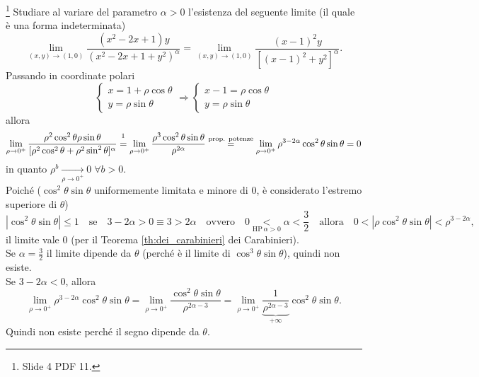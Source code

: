 \begin{example}\footnote{Slide 4 PDF 11.}
    Studiare al variare del parametro $\alpha>0$ l'esistenza del seguente limite (il quale è una forma indeterminata)
    \begin{equation*}
        \lim_{(x,y)\rightarrow(1,0)}\frac{(x^2-2x+1)y}{(x^2-2x+1+y^2)^\alpha}=\lim_{(x,y)\rightarrow(1,0)}\frac{(x-1)^2y}{[(x-1)^2+y^2]^\alpha}.
    \end{equation*}
    Passando in coordinate polari
    \begin{equation*}
        \begin{cases}
            x=1+\rho\cos\theta\\
            y=\rho\sin\theta
        \end{cases}\Longrightarrow 
        \begin{cases}
            x-1=\rho\cos\theta\\
            y=\rho\sin\theta
        \end{cases}
    \end{equation*}
    allora
    \begin{equation*}
        \lim_{\rho\rightarrow0^+}\frac{\rho^2\cos^2\theta\rho\sin\theta}{[\rho^2\cos^2\theta+\rho^2\sin^2\theta]^\alpha}\overset{\footnotemark}{=}\lim_{\rho\rightarrow 0^+}\frac{\rho^3\cos^2\theta\sin\theta}{\rho^{2\alpha}}\overset{\text{prop. potenze}}{=}\lim_{\rho\rightarrow 0^+}\rho^{3-2\alpha}\cos^2\theta\sin\theta=0
    \end{equation*}
    in quanto $\rho^b\underset{\rho\rightarrow0^+}{\longrightarrow}0\;\forall b>0$.\\
    Poiché ($\cos^2\theta\sin\theta$ uniformemente limitata e minore di 0, è considerato l'estremo superiore di $\theta$)
    \begin{equation*}
        |\cos^2\theta\sin\theta|\leq 1\quad\text{se}\quad 3-2\alpha>0\equiv3>2\alpha\quad\text{ovvero}\quad 0\underset{\text{HP}\, \alpha>0}{<}\alpha<\frac{3}{2}\quad\text{allora}\quad 0<|\rho\cos^2\theta\sin\theta|<\rho^{3-2\alpha},
    \end{equation*}
    il limite vale 0 (per il Teorema \ref{th:dei_carabinieri} dei Carabinieri).\\
    Se $\alpha=\frac{3}{2}$ il limite dipende da $\theta$ (perché è il limite di $\cos^3\theta\sin\theta$), quindi non esiste.\\
    Se $3-2\alpha<0$, allora
    \begin{equation*}
        \lim_{\rho\rightarrow0^+}\rho^{3-2\alpha}\cos^2\theta\sin\theta=\lim_{\rho\rightarrow0^+}\frac{\cos^2\theta\sin\theta}{\rho^{2\alpha-3}}=\lim_{\rho\rightarrow0^+}\underbrace{\frac{1}{\rho^{2\alpha-3}}}_{+\infty}\cos^2\theta\sin\theta.
    \end{equation*}
    Quindi non esiste perché il segno dipende da $\theta$.
\end{example}

